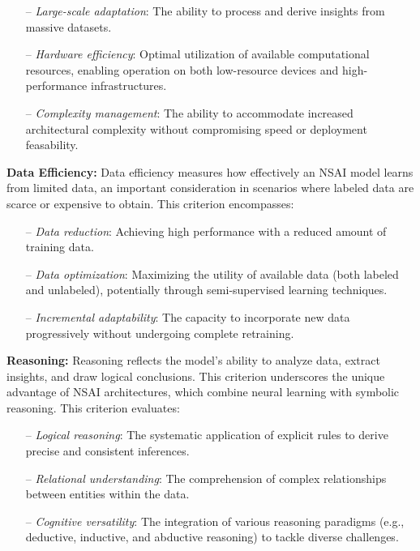 \documentclass[12pt]{article}
\begin{document}
\begin{itemize}
    \item[--] \textit{Large-scale adaptation}: The ability to process and derive insights from massive datasets.
    \item[--] \textit{Hardware efficiency}: Optimal utilization of available computational resources, enabling operation on both low-resource devices and high-performance infrastructures.
    \item[--] \textit{Complexity management}: The ability to accommodate increased architectural complexity without compromising speed or deployment feasability.
\end{itemize}

\noindent \textbf{Data Efficiency:}
Data efficiency measures how effectively an NSAI model learns from limited data, an important consideration in scenarios where labeled data are scarce or expensive to obtain. This criterion encompasses: 

\begin{itemize}
    \item[--] \textit{Data reduction}: Achieving high performance with a reduced amount of training data.
    \item[--] \textit{Data optimization}: Maximizing the utility of available data (both labeled and unlabeled), potentially through semi-supervised learning techniques.
    \item[--] \textit{Incremental adaptability}: The capacity to incorporate new data progressively without undergoing complete retraining.
\end{itemize}

\noindent \textbf{Reasoning:}
Reasoning reflects the model's ability to analyze data, extract insights, and draw logical conclusions. This criterion underscores the unique advantage of NSAI architectures, which combine neural learning with symbolic reasoning. This criterion evaluates:

\begin{itemize}
    \item[--] \textit{Logical reasoning}: The systematic application of explicit rules to derive precise and consistent inferences. 
    \item[--] \textit{Relational understanding}: The comprehension of complex relationships between entities within the data.
    \item[--] \textit{Cognitive versatility}: The integration of various reasoning paradigms (e.g., deductive, inductive, and abductive reasoning) to tackle diverse challenges. 
\end{itemize}
\end{document}
